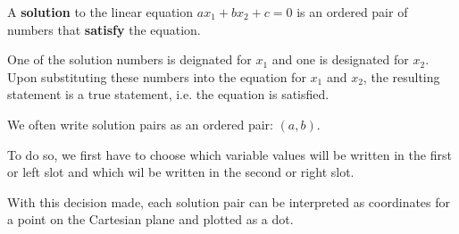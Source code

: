 \documentclass{ximera}
\begin{document}
\begin{definition}


A \textbf{solution} to the linear equation  $a x_1 + b x_2 + c = 0$ is an ordered pair of numbers that \textbf{satisfy} the equation.

One of the solution numbers is deignated for $x_1$ and one is designated for $x_2$.  Upon substituting these numbers into the equation for $x_1$ and $x_2$, the resulting statement is a true statement, i.e. the equation is satisfied.






\end{definition}



We often write solution pairs as an ordered pair: $(a, b)$.


To do so, we first have to choose which variable values will be written in the first or left slot and which wil be written in the second or right slot.


With this decision made, each solution pair can be interpreted as coordinates for a point on the Cartesian plane and plotted as a dot.
\end{document}
